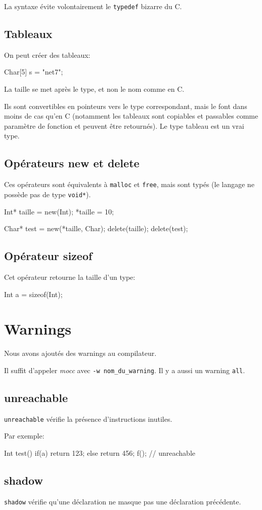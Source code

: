 \documentclass{scrartcl}
\newcommand{\mocc}{\textit{mocc}}
\begin{document}
    La syntaxe évite volontairement le \verb+typedef+ bizarre du C.

  \subsection{Tableaux}
    On peut créer des tableaux:
    \begin{moccode}
Char[5] s = "net7";
    \end{moccode}

    La taille se met après le type, et non le nom comme en C.

    Ils sont convertibles en pointeurs vers le type correspondant, mais le font
    dans moins de cas qu'en C (notamment les tableaux sont copiables et
    passables comme paramètre de fonction et peuvent être retournés). Le type
    tableau est un vrai type.

  \subsection{Opérateurs new et delete}\label{new}
    Ces opérateurs sont équivalents à \verb+malloc+ et \verb+free+, mais sont
    typés (le langage ne possède pas de type \verb+void*+).

    \begin{moccode}
Int* taille = new(Int);
*taille = 10;

Char* test = new(*taille, Char);
delete(taille);
delete(test);
    \end{moccode}

  \subsection{Opérateur sizeof}
    Cet opérateur retourne la taille d'un type:

    \begin{moccode}
Int a = sizeof(Int);
    \end{moccode}

\section{Warnings}
  Nous avons ajoutés des warnings au compilateur.

  Il suffit d'appeler \mocc{} avec \verb+-w nom_du_warning+.
  Il y a aussi un warning \verb+all+.

  \subsection{unreachable}
    \verb"unreachable" vérifie la présence d'instructions inutiles.

    Par exemple:
    \begin{moccode}
Int test() {
    if(a) {
        return 123;
    }
    else {
        return 456;
    }
    f(); // unreachable
}
    \end{moccode}

  \subsection{shadow}
    \verb"shadow" vérifie qu'une déclaration ne masque pas une déclaration
    précédente.
\end{document}
